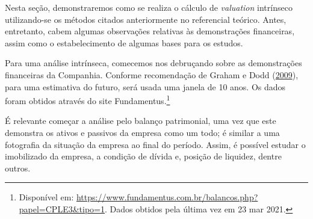 \documentclass[grad,numbers]{coppe}
\begin{document}
  Nesta seção, demonstraremos como se realiza o cálculo de \emph{valuation} intrínseco utilizando-se os métodos citados anteriormente no referencial teórico. Antes, entretanto, cabem algumas observações relativas às demonstrações financeiras, assim como o estabelecimento de algumas bases para os estudos.

  Para uma análise intrínseca, comecemos nos debruçando sobre as demonstrações financeiras da Companhia. Conforme recomendação de Graham e Dodd (\protect\hyperlink{ref-graham2009}{2009}), para uma estimativa do futuro, será usada uma janela de 10 anos. Os dados foram obtidos através do site Fundamentus.\footnote{Disponível em: \url{https://www.fundamentus.com.br/balancos.php?papel=CPLE3\&tipo=1}. Dados obtidos pela última vez em 23 mar 2021.}

  É relevante começar a análise pelo balanço patrimonial, uma vez que este demonstra os ativos e passivos da empresa como um todo; é similar a uma fotografia da situação da empresa ao final do período. Assim, é possível estudar o imobilizado da empresa, a condição de dívida e, posição de liquidez, dentre outros.
\end{document}
